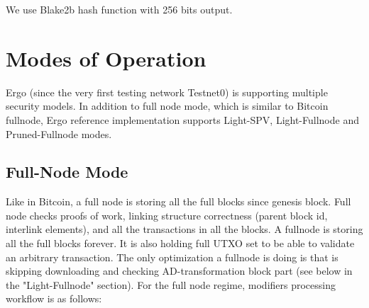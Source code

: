 \documentclass[]{article}   %
\newcommand{\authnote}[2]{\marginpar{\parbox{\marginparwidth}{\tiny %
  \textsf{#1 {\textcolor{blue}{notes: #2}}}}}%
  \textcolor{blue}{\textbf{\dag}}}
\newcommand{\authnote}[2]{
  \textsf{#1 \textcolor{blue}{: #2}}}
\newcommand{\authnote}[2]{}
\newcommand{\knote}[1]{{\authnote{\textcolor{green}{Alex notes}}{#1}}}
\begin{document}
We use Blake2b hash function with 256 bits output.

\knote{describe a curve used}


\section{Modes of Operation}
Ergo (since the very first testing network Testnet0) is supporting multiple security models. In addition to full node
mode, which is similar to Bitcoin fullnode, Ergo reference implementation supports Light-SPV, Light-Fullnode and Pruned-Fullnode modes.

\subsection{Full-Node Mode}
Like in Bitcoin, a full node is storing all the full blocks since genesis block. Full node checks proofs of work, linking structure correctness (parent block id, interlink elements), and all the transactions in all the blocks. A fullnode is storing all the full blocks forever. It is also holding full UTXO set to be able to validate an arbitrary transaction.
The only optimization a fullnode is doing is that is skipping downloading and checking AD-transformation block part (see below in the "Light-Fullnode" section).
For the full node regime, modifiers processing workflow is as follows:
\end{document}
